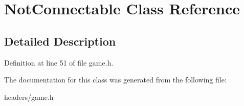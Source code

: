 \hypertarget{classNotConnectable}{\section{Not\+Connectable Class Reference}
\label{classNotConnectable}
}


\subsection{Detailed Description}


Definition at line 51 of file game.\+h.



The documentation for this class was generated from the following file\+:\begin{DoxyCompactItemize}
\item 
headers/game.\+h\end{DoxyCompactItemize}
